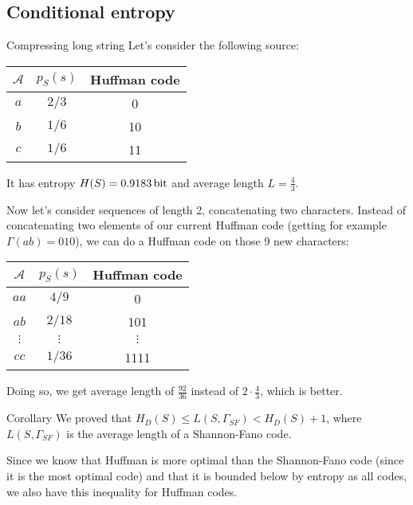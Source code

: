 \documentclass[a4paper]{article}
\begin{document}
\subsection{Conditional entropy}
\begin{parag}{Compressing long string}
    Let's consider the following source:
    \begin{center}
    \begin{tabular}{c|c|c}
        $\mathcal{A}$ & $p_S\left(s\right)$ & Huffman code \\
        \hline
        $a$ & $2 / 3$ & 0 \\
        $b$ & $1 / 6$ & 10 \\
        $c$ & $1 / 6$ & 11
    \end{tabular}
    \end{center}

    It has entropy $H\left(S\right) = \SI{0.9183}{\bit}$ and average length $L = \frac{4}{3}$.

    Now let's consider sequences of length 2, concatenating two characters. Instead of concatenating two elements of our current Huffman code (getting for example $\Gamma\left(ab\right) = 010$), we can do a Huffman code on those 9 new characters:
    \begin{center}
    \begin{tabular}{c|c|c}
        $\mathcal{A}$ & $p_S\left(s\right)$ & Huffman code \\
        \hline
        $aa$ & $4 / 9$ & 0 \\
        $ab$ & $2 / 18$ & 101 \\
        $\vdots$ & $\vdots$ & $\vdots$ \\
        $cc$ & $1 / 36$ & 1111
    \end{tabular}
    \end{center}

    Doing so, we get average length of $\frac{92}{36}$ instead of $2\cdot \frac{4}{3}$, which is better.
\end{parag}

\begin{parag}{Corollary}
    We proved that $H_D\left(S\right) \leq L\left(S, \Gamma_{SF}\right) < H_D\left(S\right) + 1$, where $L\left(S, \Gamma_{SF}\right)$ is the average length of a Shannon-Fano code.

    Since we know that Huffman is more optimal than the Shannon-Fano code (since it is the most optimal code) and that it is bounded below by entropy as all codes, we also have this inequality for Huffman codes.
\end{parag}
\end{document}
